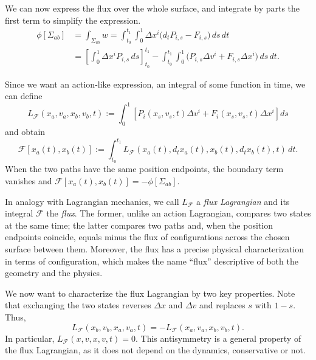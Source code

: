 \documentclass[12pt]{article}
\begin{document}
We can now express the flux over the whole surface, and integrate by parts the first term to simplify the expression.
\begin{equation}
	\begin{aligned}
		\phi[\Sigma_{ab}]
		&= \int_{\Sigma_{ab}} w = 
		\int_{t_0}^{t_1}\int_0^1
		\Delta x^i\bigl(d_tP_{i,s}-F_{i,s}\bigr)\,ds\,dt\\
		&=
		\left[
		\int_0^1\Delta x^iP_{i,s}\,ds
		\right]_{t_0}^{t_1}
		-
		\int_{t_0}^{t_1}\int_0^1
		\bigl(P_{i,s}\Delta v^i+F_{i,s}\Delta x^i\bigr)\,ds\,dt.
	\end{aligned}
\end{equation}

Since we want an action-like expression, an integral of some function in time, we can define
\begin{equation}\label{eq:properFluxLagrangian}
	L_{\mathcal{F}}(x_a,v_a,x_b,v_b,t)
	:=
	\int_0^1
	\left[
	P_i(x_s,v_s,t)\Delta v^i
	+F_i(x_s,v_s,t)\Delta x^i
	\right]ds
\end{equation}
and obtain
\begin{equation}\label{eq:fluxLagrangianFlux}
	\mathcal{F}[x_a(t),x_b(t)]
	:=
	\int_{t_0}^{t_1}L_{\mathcal{F}}(x_a(t),d_t x_a(t),x_b(t),d_t x_b(t),t)\,dt.
\end{equation}
When the two paths have the same position endpoints, the boundary term vanishes and $\mathcal{F}[x_a(t),x_b(t)]=-\phi[\Sigma_{ab}]$.

In analogy with Lagrangian mechanics, we call $L_{\mathcal{F}}$ a \emph{flux Lagrangian} and its integral $\mathcal{F}$ the \emph{flux}. The former, unlike an action Lagrangian, compares two states at the same time; the latter compares two paths and, when the position endpoints coincide, equals minus the flux of configurations across the chosen surface between them. Moreover, the flux has a precise physical characterization in terms of configuration, which makes the name ``flux'' descriptive of both the geometry and the physics.

We now want to characterize the flux Lagrangian by two key properties. Note that exchanging the two states reverses $\Delta x$ and $\Delta v$ and replaces $s$ with $1-s$. Thus,
\begin{equation}\label{eq:fluxLagrangianAntisymmetry}
	L_{\mathcal{F}}(x_b,v_b,x_a,v_a,t)
	=
	-L_{\mathcal{F}}(x_a,v_a,x_b,v_b,t).
\end{equation}
In particular, $L_{\mathcal{F}}(x,v,x,v,t)=0$. This antisymmetry is a general property of the flux Lagrangian, as it does not depend on the dynamics, conservative or not.
\end{document}

